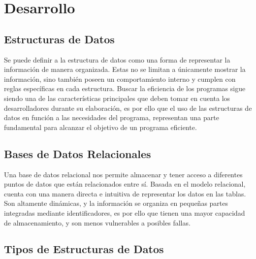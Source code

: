 \documentclass{article}
\begin{document}
\section{Desarrollo}
\subsection{Estructuras de Datos}
Se puede definir a la estructura de datos como una forma de representar la información de manera organizada. Estas no se limitan a únicamente mostrar la información, sino también poseen un comportamiento interno y cumplen con reglas específicas en cada estructura.
Buscar la eficiencia de los programas sigue siendo una de las características principales que deben tomar en cuenta los desarrolladores durante su elaboración, es por ello que el uso de las estructuras de datos en función a las necesidades del programa, representan una parte fundamental para alcanzar el objetivo de un programa eficiente.

\subsection{Bases de Datos Relacionales}
Una base de datos relacional nos permite almacenar y tener acceso a diferentes puntos de datos que están relacionados entre sí. Basada en el modelo relacional, cuenta con una manera directa e intuitiva de representar los datos en las tablas. Son altamente dinámicas, y la información se organiza en pequeñas partes integradas mediante identificadores, es por ello que tienen una mayor capacidad de almacenamiento, y son menos vulnerables a posibles fallas. 

\subsection{Tipos de Estructuras de Datos}
\end{document}

